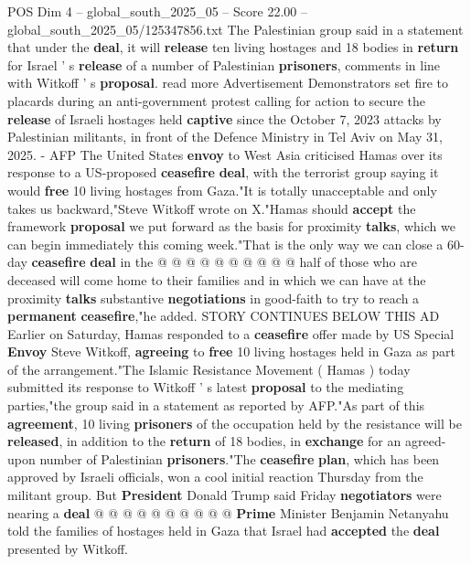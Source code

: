 \begin{textsample}{POS Dim 4 – global\_south\_2025\_05 – Score 22.00 – global\_south\_2025\_05/125347856.txt}  \label{ex:f4_pos_096}
The Palestinian group said in a statement that under the \textbf{deal}, it will \textbf{release} ten living hostages and 18 bodies in \textbf{return} for Israel ' s \textbf{release} of a number of Palestinian \textbf{prisoners}, comments in line with Witkoff ' s \textbf{proposal}. read more Advertisement Demonstrators set fire to placards during an anti-government protest calling for action to secure the \textbf{release} of Israeli hostages held \textbf{captive} since the October 7, 2023 attacks by Palestinian militants, in front of the Defence Ministry in Tel Aviv on May 31, 2025. - AFP The United States \textbf{envoy} to West Asia criticised Hamas over its response to a US-proposed \textbf{ceasefire} \textbf{deal}, with the terrorist group saying it would \textbf{free} 10 living hostages from Gaza."It is totally unacceptable and only takes us backward,"Steve Witkoff wrote on X."Hamas should \textbf{accept} the framework \textbf{proposal} we put forward as the basis for proximity \textbf{talks}, which we can begin immediately this coming week."That is the only way we can close a 60-day \textbf{ceasefire} \textbf{deal} in the @ @ @ @ @ @ @ @ @ @ half of those who are deceased will come home to their families and in which we can have at the proximity \textbf{talks} substantive \textbf{negotiations} in good-faith to try to reach a \textbf{permanent} \textbf{ceasefire},"he added.
STORY CONTINUES BELOW THIS AD Earlier on Saturday, Hamas responded to a \textbf{ceasefire} offer made by US Special \textbf{Envoy} Steve Witkoff, \textbf{agreeing} to \textbf{free} 10 living hostages held in Gaza as part of the arrangement."The Islamic Resistance Movement ( Hamas ) today submitted its response to Witkoff ' s latest \textbf{proposal} to the mediating parties,"the group said in a statement as reported by AFP."As part of this \textbf{agreement}, 10 living \textbf{prisoners} of the occupation held by the resistance will be \textbf{released}, in addition to the \textbf{return} of 18 bodies, in \textbf{exchange} for an agreed-upon number of Palestinian \textbf{prisoners}."The \textbf{ceasefire} \textbf{plan}, which has been approved by Israeli officials, won a cool initial reaction Thursday from the militant group.
But \textbf{President} Donald Trump said Friday \textbf{negotiators} were nearing a \textbf{deal} @ @ @ @ @ @ @ @ @ @ \textbf{Prime} Minister Benjamin Netanyahu told the families of hostages held in Gaza that Israel had \textbf{accepted} the \textbf{deal} presented by Witkoff.

\end{textsample}
